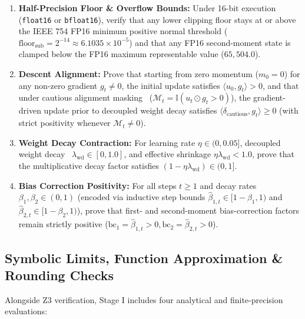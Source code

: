 \documentclass[11pt,a4paper]{article}
\renewcommand{\_}{\origunderscore\allowbreak}
\begin{document}
\begin{enumerate}[label=\textbf{Q\arabic*.}, leftmargin=2.4em, itemsep=0.45em]
    \item \textbf{Half-Precision Floor \& Overflow Bounds:} Under 16-bit execution (\texttt{float16} or \texttt{bfloat16}), verify that any lower clipping floor stays at or above the IEEE 754 FP16 minimum positive normal threshold ($\text{floor}_{\text{sub}} = 2^{-14} \approx 6.1035 \times 10^{-5}$) and that any FP16 second-moment state is clamped below the FP16 maximum representable value ($65,504.0$).

    \item \textbf{Descent Alignment:} Prove that starting from zero momentum ($m_0 = 0$) for any non-zero gradient $g_t \neq 0$, the initial update satisfies $\langle u_0, g_t \rangle > 0$, and that under cautious alignment masking~\cite{liang2026cautious} ($\mathcal{M}_t = \mathbb{I}(u_t \odot g_t > 0)$), the gradient-driven update prior to decoupled weight decay satisfies $\langle \delta_{\text{cautious}}, g_t \rangle \ge 0$ (with strict positivity whenever $\mathcal{M}_t \neq 0$).

    \item \textbf{Weight Decay Contraction:} For learning rate $\eta \in (0, 0.05]$, decoupled weight decay~\cite{loshchilov2019adamw} $\lambda_{\text{wd}} \in [0, 1.0]$, and effective shrinkage $\eta\lambda_{\text{wd}} < 1.0$, prove that the multiplicative decay factor satisfies $(1 - \eta\lambda_{\text{wd}}) \in (0, 1]$.

    \item \textbf{Bias Correction Positivity:} For all steps $t \ge 1$ and decay rates $\beta_1, \beta_2 \in (0, 1)$ (encoded via inductive step bounds $\hat{\beta}_{1,t} \in [1-\beta_1, 1)$ and $\hat{\beta}_{2,t} \in [1-\beta_2, 1)$), prove that first- and second-moment bias-correction factors remain strictly positive ($\text{bc}_1 = \hat{\beta}_{1,t} > 0, \text{bc}_2 = \hat{\beta}_{2,t} > 0$).
\end{enumerate}

\subsection{Symbolic Limits, Function Approximation \& Rounding Checks}
\noindent
Alongside Z3 verification, Stage I includes four analytical and finite-precision evaluations:
\end{document}
